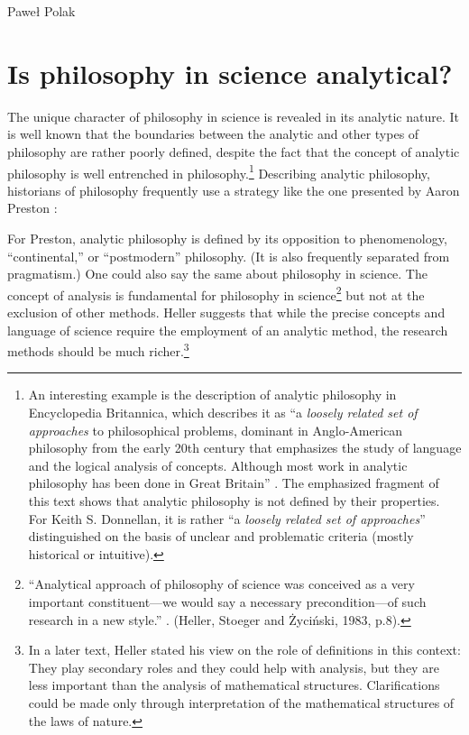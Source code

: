 \begin{artengenv}{Paweł Polak}
\enlargethispage{1\baselineskip}

\section{Is philosophy in science analytical?}
The unique character of philosophy in science is revealed in its analytic nature. It is well known that the boundaries
between the analytic and other types of philosophy are rather poorly defined, despite the fact that the concept of
analytic philosophy is well entrenched in philosophy.\footnote{An interesting example is the description of analytic
philosophy in Encyclopedia Britannica, which describes it as ``a \textit{loosely related set of approaches} to
philosophical problems, dominant in Anglo-American philosophy from the early 20th century that emphasizes the study of
language and the logical analysis of concepts. Although most work in analytic philosophy has been done in Great
Britain''
\parencite{pol_preston_analytic_nodate}.
The emphasized fragment of this text shows that analytic philosophy is not defined by their
properties. For Keith S. Donnellan, it is rather ``a \textit{loosely related set of approaches}'' distinguished on the
basis of unclear and problematic criteria (mostly historical or intuitive).} Describing
analytic philosophy, historians of philosophy frequently use a strategy like the one presented by Aaron Preston
\parencite*{pol_preston_analytic_nodate}:




For Preston, analytic philosophy is defined by its opposition to phenomenology, ``continental,'' or ``postmodern''
philosophy. (It is also frequently separated from pragmatism.) One could also say the same about philosophy in science.
The concept of analysis is fundamental for philosophy in science\footnote{``Analytical approach of philosophy of science
was conceived as a very important constituent—we would say a necessary precondition—of such research in a new style.''
\parencite[p.8]{pol_heller_introduction_1983}.
(Heller, Stoeger and Życiński, 1983, p.8).
} but not at the exclusion of other methods. Heller suggests that while the
precise concepts and language of science require the employment of an analytic method, the research methods should be
much richer.\footnote{In a later text, Heller stated his view on the role of definitions in this context: They play
secondary roles and they could help with analysis, but they are less important than the analysis of mathematical
structures. Clarifications could be made only through interpretation of the mathematical structures of the laws of
nature.}


\end{artengenv}
